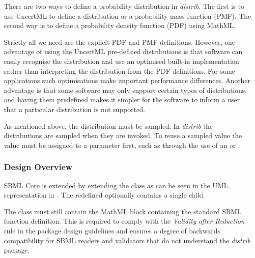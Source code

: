 \documentclass[draftspec]{sbmlpkgspec}
\newcommand{\distribshort}{\emph{distrib}\xspace}
\newcommand{\mathml}{MathML\xspace}
\begin{document}
There are two ways to define a probability distribution in
\distribshort. The first is to use UncertML to define a distribution
or a probability mass function (PMF).  The second way is to define
a probability density function (PDF) using MathML.

Strictly all we need are the explicit PDF and PMF
definitions. However, one advantage of using the UncertML pre-defined
distributions is that software can easily recognise the distribution
and use an optimised built-in implementation rather than interpreting
the distribution from the PDF definitions. For some
applications such optimisations make important performance
differences.  Another advantage is that some software may only support certain types of distributions, and having them predefined makes it simpler for the software to inform a user that a particular distribution is not supported.

As mentioned above, the distribution must be sampled. In \distribshort
the distributions are sampled when they are invoked. To reuse a
sampled value the value must be assigned to a parameter first, such as through the use of an \InitialAssignment or \EventAssignment.

\subsubsection{Design Overview}

SBML Core is extended by extending the \FunctionDefinition class as
can be seen in the UML representation in . The redefined \FunctionDefinition optionally
contains a single  child.

The \FunctionDefinition class must still contain the
\mathml block containing the standard SBML function definition. This is
required to comply with the \emph{Validity after Reduction} rule in the
package design guidelines \cite{sbmll3v1packrule} and ensures a degree
of backwards compatibility for SBML readers and validators that do not
understand the \distribshort package.
\end{document}
